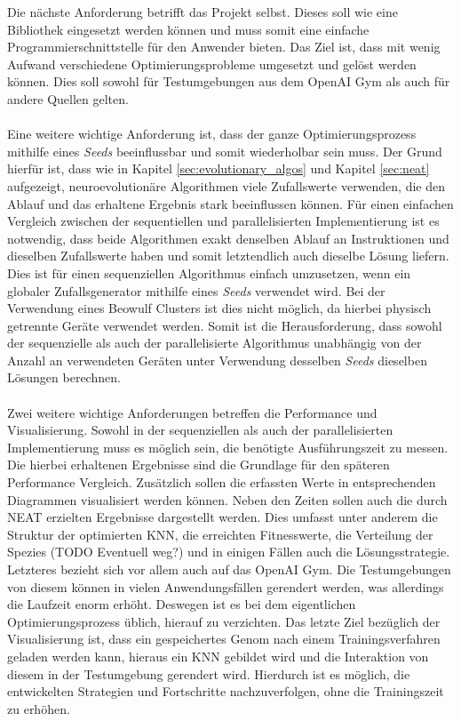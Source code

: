 Die nächste Anforderung betrifft das Projekt selbst. Dieses soll wie eine Bibliothek eingesetzt werden können und muss somit eine einfache Programmierschnittstelle für den Anwender bieten. Das Ziel ist, dass mit wenig Aufwand verschiedene Optimierungsprobleme umgesetzt und gelöst werden können. Dies soll sowohl für Testumgebungen aus dem OpenAI Gym als auch für andere Quellen gelten. 
\\\\ %
Eine weitere wichtige Anforderung ist, dass der ganze Optimierungsprozess mithilfe eines \emph{Seeds} beeinflussbar und somit wiederholbar sein muss. Der Grund hierfür ist, dass wie in Kapitel \ref{sec:evolutionary_algos} und Kapitel \ref{sec:neat} aufgezeigt, neuroevolutionäre Algorithmen viele Zufallswerte verwenden, die den Ablauf und das erhaltene Ergebnis stark beeinflussen können. Für einen einfachen Vergleich zwischen der sequentiellen und parallelisierten Implementierung ist es notwendig, dass beide Algorithmen exakt denselben Ablauf an Instruktionen und dieselben Zufallswerte haben und somit letztendlich auch dieselbe Lösung liefern. Dies ist für einen sequenziellen Algorithmus einfach umzusetzen, wenn ein globaler Zufallsgenerator mithilfe eines \emph{Seeds} verwendet wird. Bei der Verwendung eines Beowulf Clusters ist dies nicht möglich, da hierbei physisch getrennte Geräte verwendet werden. Somit ist die Herausforderung, dass sowohl der sequenzielle als auch der parallelisierte Algorithmus unabhängig von der Anzahl an verwendeten Geräten unter Verwendung desselben \emph{Seeds} dieselben Lösungen berechnen.
\\\\
Zwei weitere wichtige Anforderungen betreffen die Performance und Visualisierung. Sowohl in der sequenziellen als auch der parallelisierten Implementierung muss es möglich sein, die benötigte Ausführungszeit zu messen. Die hierbei erhaltenen Ergebnisse sind die Grundlage für den späteren Performance Vergleich. Zusätzlich sollen die erfassten Werte in entsprechenden Diagrammen visualisiert werden können. Neben den Zeiten sollen auch die durch \ac{NEAT} erzielten Ergebnisse dargestellt werden. Dies umfasst unter anderem die Struktur der optimierten \ac{KNN}, die erreichten Fitnesswerte, die Verteilung der Spezies (TODO Eventuell weg?) und in einigen Fällen auch die Lösungsstrategie. Letzteres bezieht sich vor allem auch auf das OpenAI Gym. Die Testumgebungen von diesem können in vielen Anwendungsfällen gerendert werden, was allerdings die Laufzeit enorm erhöht. Deswegen ist es bei dem eigentlichen Optimierungsprozess üblich, hierauf zu verzichten. Das letzte Ziel bezüglich der Visualisierung ist, dass ein gespeichertes Genom nach einem Trainingsverfahren geladen werden kann, hieraus ein \ac{KNN} gebildet wird und die Interaktion von diesem in der Testumgebung gerendert wird. Hierdurch ist es möglich, die entwickelten Strategien und Fortschritte nachzuverfolgen, ohne die Trainingszeit zu erhöhen.
